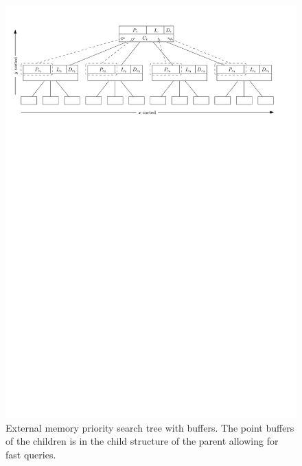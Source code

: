 \documentclass[twoside,11pt,openright]{report}
\begin{document}
\begin{figure}
	\centering
	\includegraphics[width=\textwidth]{../figures/gerth_tree}
	\caption{External memory priority search tree with buffers. The point buffers of the children is in the child structure of the parent allowing for fast queries.}
	\label{fig:gerth_tree}
\end{figure}



\end{document}
